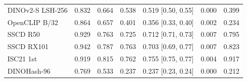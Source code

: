 \begin{table}[!t]
\begin{tabular}{lcccccc}
DINOv2-S LSH-256 & 0.832 & 0.664 & 0.538 & 0.519 \tiny[0.50, 0.55] & 0.000 & 0.399 \\
OpenCLIP B/32 & 0.864 & 0.657 & 0.401 & 0.356 \tiny[0.33, 0.40] & 0.002 & 0.234 \\
SSCD R50 & 0.929 & 0.763 & 0.725 & 0.712 \tiny[0.71, 0.73] & 0.007 & 0.795 \\
SSCD RX101 & 0.942 & 0.787 & 0.763 & 0.703 \tiny[0.69, 0.77] & 0.007 & 0.823 \\
ISC21 1st & 0.919 & 0.815 & 0.762 & 0.755 \tiny[0.75, 0.77] & 0.004 & 0.917 \\
DINOHash-96 & 0.769 & 0.533 & 0.237 & 0.237 \tiny[0.23, 0.24] & 0.000 & 0.212 \\
\bottomrule
\end{tabular}

\end{table}
